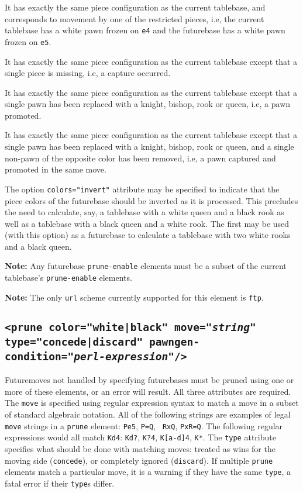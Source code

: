 \documentclass[11pt]{article}
\begin{document}
\begin{description}
\item It has exactly the same piece configuration as the
current tablebase, and corresponds to movement by one of the
restricted pieces, i.e, the current tablebase has a white pawn frozen
on {\tt e4} and the futurebase has a white pawn frozen on {\tt e5}.

\item It has exactly the same piece configuration as
the current tablebase except that a single piece is missing, i.e,
a capture occurred.

\item It has exactly the same piece configuration as the current
tablebase except that a single pawn has been replaced with a knight,
bishop, rook or queen, i.e, a pawn promoted.

\item It has exactly the same piece configuration as the current
tablebase except that a single pawn has been replaced with a knight,
bishop, rook or queen, and a single non-pawn of the opposite color has
been removed, i.e, a pawn captured and promoted in the same move.

\end{description}

The option {\tt colors="invert"} attribute may be specified to indicate
that the piece colors of the futurebase should be inverted as it is
processed.  This precludes the need to calculate, say, a tablebase
with a white queen and a black rook as well as a tablebase with a
black queen and a white rook.  The first may be used (with this
option) as a futurebase to calculate a tablebase with two white rooks
and a black queen.

{\bf Note:} Any futurebase {\tt prune-enable} elements must be a subset of
the current tablebase's {\tt prune-enable} elements.

{\bf Note:} The only {\tt url} scheme currently supported for this
element is {\tt ftp}.

\subsection{\tt <prune color="white|black" move="{\it string}" type="concede|discard" \hfil\break\hbox{\qquad} pawngen-condition="{\it perl-expression}"/>}

Futuremoves not handled by specifying futurebases must be pruned using
one or more of these elements, or an error will result.  All three
attributes are required.  The {\tt move} is specified using regular
expression syntax to match a move in a subset of standard algebraic
notation.  All of the following strings are examples of legal {\tt
move} strings in a {\tt prune} element: {\tt Pe5}, {\tt P=Q}, {\tt
RxQ}, {\tt PxR=Q}.  The following regular expressions would all match
{\tt Kd4}: {\tt Kd?}, {\tt K?4}, {\tt K[a-d]4}, {\tt K*}.
The {\tt type} attribute specifies what should be done with matching
moves: treated as wins for the moving side ({\tt concede}), or
completely ignored ({\tt discard}).  If multiple {\tt prune}
elements match a particular move, it is a warning if they have the
same {\tt type}, a fatal error if their {\tt type}s differ.
\end{document}
